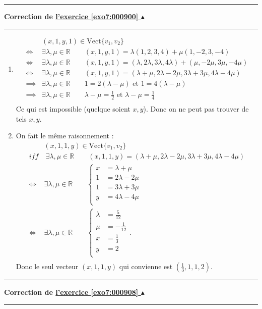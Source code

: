\documentclass[11pt,a4paper]{article}
\newcommand{\Rr}{\mathbb{R}} \newcommand{\R}{\mathbb{R}}
\newcounter{exo}
\newcommand{\correction}[1]{\hypertarget{cor7:#1}{}\label{cor7:#1}{\bf Correction de \hyperlink{exo7:#1}{l'exercice \ref{exo7:#1} $\blacktriangle$}}\vspace{1mm}\hrule\vspace{1mm}}
\newcommand{\fincorrection}{\vspace{1mm}\hrule\vspace*{7mm}}
\begin{document}
\fincorrection
\correction{000900}
\begin{enumerate}
\item 
\begin{align*}
& (x,1,y,1) \in \text{Vect}\{v_1,v_2\} \\ 
\iff& \exists \lambda,\mu\in \Rr \qquad (x,1,y,1) = \lambda(1,2,3,4)+\mu(1,-2,3,-4) \\
\iff& \exists \lambda,\mu\in \Rr \qquad (x,1,y,1) = (\lambda,2\lambda,3\lambda,4\lambda)+(\mu,-2\mu,3\mu,-4\mu) \\
\iff& \exists \lambda,\mu\in \Rr \qquad (x,1,y,1) = (\lambda+\mu,2\lambda-2\mu,3\lambda+3\mu,4\lambda-4\mu) \\
\implies& \exists \lambda,\mu\in \Rr \qquad 1 = 2(\lambda-\mu) \text{ et } 1=4(\lambda-\mu) \\
\implies& \exists \lambda,\mu\in \Rr \qquad \lambda-\mu= \frac 12 \text{ et } \lambda-\mu=\frac14 \\
\end{align*}
Ce qui est impossible (quelque soient $x,y$). Donc on ne peut pas trouver de tels $x,y$.

\item On fait le m\^eme raisonnement : 
\begin{align*}
& (x,1,1,y) \in \text{Vect}\{v_1,v_2\} \\ 
iff&\ \exists \lambda,\mu\in \Rr \qquad (x,1,1,y) = (\lambda+\mu,2\lambda-2\mu,3\lambda+3\mu,4\lambda-4\mu) \\
\iff& \exists \lambda,\mu\in \Rr \qquad 
\begin{cases}
  x &= \lambda + \mu \\
  1  &= 2\lambda -2\mu \\
  1 &= 3\lambda +3\mu \\
  y &= 4\lambda -4 \mu \\
 \end{cases} \\
\iff& \exists \lambda,\mu\in \Rr \qquad 
\begin{cases}
  \lambda &= \frac 5{12} \\
  \mu &=  -\frac1{12} \\
  x &= \frac 13 \\
  y &=  2 \\  
\end{cases}.\\
\end{align*}  
Donc le seul vecteur $(x,1,1,y)$ qui convienne est $(\frac13,1,1,2)$.
\end{enumerate}
\fincorrection
\correction{000908}
\end{document}
